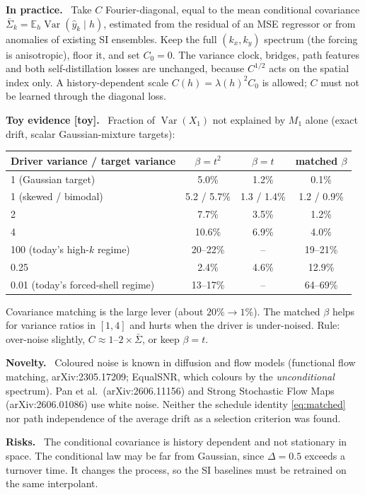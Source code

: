 \documentclass[11pt,a4paper]{article}
\newcommand{\E}{\mathbb{E}}
\newcommand{\Var}{\operatorname{Var}}
\newcommand{\status}[1]{\textsf{\small\color{black!60}[#1]}}
\newcommand{\head}[1]{\par\smallskip\noindent\textbf{#1}\ }
\begin{document}
\head{In practice.} Take $C$ Fourier-diagonal, equal to the mean conditional covariance $\bar\Sigma_k=\E_h\Var(\hat y_k\mid h)$, estimated from the residual of an MSE regressor or from anomalies of existing SI ensembles. Keep the full $(k_x,k_y)$ spectrum (the forcing is anisotropic), floor it, and set $C_0=0$. The variance clock, bridges, path features and both self-distillation losses are unchanged, because $C^{1/2}$ acts on the spatial index only. A history-dependent scale $C(h)=\lambda(h)^2C_0$ is allowed; $C$ must not be learned through the diagonal loss.

\head{Toy evidence \status{toy}.} Fraction of $\Var(X_1)$ not explained by $M_1$ alone (exact drift, scalar Gaussian-mixture targets):

\begin{center}\small
\begin{tabular}{lccc}
\toprule
Driver variance / target variance & $\beta=t^2$ & $\beta=t$ & matched $\beta$\\
\midrule
1 (Gaussian target) & 5.0\% & 1.2\% & 0.1\%\\
1 (skewed / bimodal) & 5.2 / 5.7\% & 1.3 / 1.4\% & 1.2 / 0.9\%\\
2 & 7.7\% & 3.5\% & 1.2\%\\
4 & 10.6\% & 6.9\% & 4.0\%\\
100 (today's high-$k$ regime) & 20--22\% & -- & 19--21\%\\
0.25 & 2.4\% & 4.6\% & 12.9\%\\
0.01 (today's forced-shell regime) & 13--17\% & -- & 64--69\%\\
\bottomrule
\end{tabular}
\end{center}

\noindent Covariance matching is the large lever (about $20\%\to1\%$). The matched $\beta$ helps for variance ratios in $[1,4]$ and hurts when the driver is under-noised. Rule: over-noise slightly, $C\approx1$--$2\times\bar\Sigma$, or keep $\beta=t$.

\head{Novelty.} Coloured noise is known in diffusion and flow models (functional flow matching, arXiv:2305.17209; EqualSNR, which colours by the \emph{unconditional} spectrum). Pan et al.\ (arXiv:2606.11156) and Strong Stochastic Flow Maps (arXiv:2606.01086) use white noise. Neither the schedule identity \eqref{eq:matched} nor path independence of the average drift as a selection criterion was found.

\head{Risks.} The conditional covariance is history dependent and not stationary in space. The conditional law may be far from Gaussian, since $\Delta=0.5$ exceeds a turnover time. It changes the process, so the SI baselines must be retrained on the same interpolant.
\end{document}
